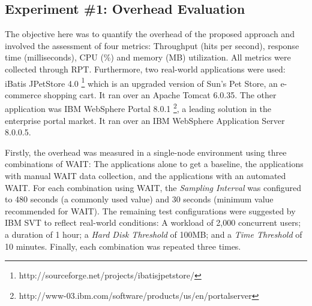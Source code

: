 \documentclass[runningheads,a4paper]{llncs}
\begin{document}
\vspace{-7pt}
\subsection{Experiment \#1: Overhead Evaluation}
\vspace{-7pt}

The objective here was to quantify the overhead of the proposed approach and
involved the assessment of four metrics: Throughput (hits per second), response
time (milliseconds), CPU (\%) and memory (MB) utilization. All metrics were
collected through RPT. Furthermore, two real-world applications were used:
iBatis JPetStore 4.0 \footnote{http://sourceforge.net/projects/ibatisjpetstore/}
which is an upgraded version of Sun's Pet Store, an e-commerce shopping cart. It
ran over an Apache Tomcat 6.0.35. The other application was IBM WebSphere Portal 
8.0.1 \footnote{http://www-03.ibm.com/software/products/us/en/portalserver},
a leading solution in the enterprise portal market. It ran over an IBM WebSphere
Application Server 8.0.0.5.

Firstly, the overhead was measured in a single-node environment using three
combinations of WAIT: The applications alone to get a baseline, the applications
with manual WAIT data collection, and the applications with an automated WAIT.
For each combination using WAIT, the \emph{Sampling Interval} was configured
to 480 seconds (a commonly used value) and 30 seconds (minimum value recommended
for WAIT). The remaining test configurations were suggested by IBM SVT to
reflect real-world conditions: A workload of 2,000 concurrent users; a duration
of 1 hour; a \emph{Hard Disk Threshold} of 100MB; and a \emph{Time Threshold} of
10 minutes. Finally, each combination was repeated three times.
\end{document}

